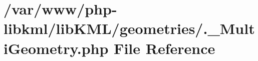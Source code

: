 \hypertarget{_8__MultiGeometry_8php}{
\section{/var/www/php-\/libkml/libKML/geometries/.\_\-MultiGeometry.php File Reference}
\label{d2/d59/_8__MultiGeometry_8php}
}
